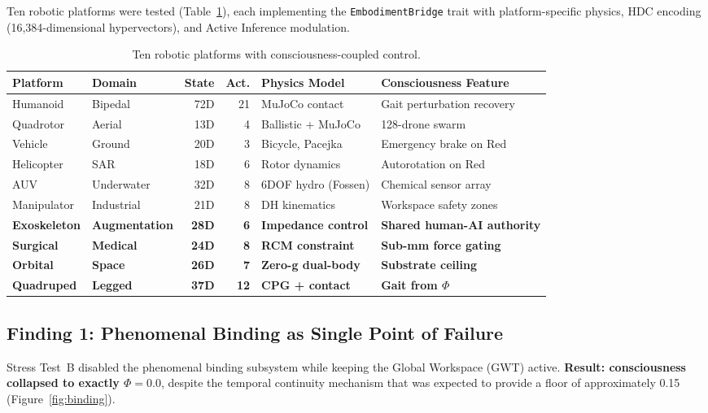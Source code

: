 \documentclass[11pt,a4paper]{article}
\begin{document}
Ten robotic platforms were tested (Table~\ref{tab:platforms}), each
implementing the \texttt{EmbodimentBridge} trait with platform-specific
physics, HDC encoding (16,384-dimensional hypervectors), and Active Inference
modulation.

\begin{table}[h]
\centering
\caption{Ten robotic platforms with consciousness-coupled control.}
\label{tab:platforms}
\begin{tabular}{llrrll}
\toprule
Platform & Domain & State & Act. & Physics Model & Consciousness Feature \\
\midrule
Humanoid & Bipedal & 72D & 21 & MuJoCo contact & Gait perturbation recovery \\
Quadrotor & Aerial & 13D & 4 & Ballistic + MuJoCo & 128-drone swarm \\
Vehicle & Ground & 20D & 3 & Bicycle, Pacejka & Emergency brake on Red \\
Helicopter & SAR & 18D & 6 & Rotor dynamics & Autorotation on Red \\
AUV & Underwater & 32D & 8 & 6DOF hydro (Fossen) & Chemical sensor array \\
Manipulator & Industrial & 21D & 8 & DH kinematics & Workspace safety zones \\
\textbf{Exoskeleton} & \textbf{Augmentation} & \textbf{28D} & \textbf{6} & \textbf{Impedance control} & \textbf{Shared human-AI authority} \\
\textbf{Surgical} & \textbf{Medical} & \textbf{24D} & \textbf{8} & \textbf{RCM constraint} & \textbf{Sub-mm force gating} \\
\textbf{Orbital} & \textbf{Space} & \textbf{26D} & \textbf{7} & \textbf{Zero-g dual-body} & \textbf{Substrate ceiling} \\
\textbf{Quadruped} & \textbf{Legged} & \textbf{37D} & \textbf{12} & \textbf{CPG + contact} & \textbf{Gait from $\Phi$} \\
\bottomrule
\end{tabular}
\end{table}

\subsection{Finding 1: Phenomenal Binding as Single Point of Failure}

Stress Test~B disabled the phenomenal binding subsystem while keeping the
Global Workspace (GWT) active. \textbf{Result: consciousness collapsed to
exactly $\Phi = 0.0$}, despite the temporal continuity mechanism that was
expected to provide a floor of approximately 0.15 (Figure~\ref{fig:binding}).
\end{document}
